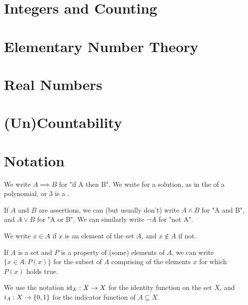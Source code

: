 \documentclass[12pt]{article}
\begin{document}
\section{Integers and Counting}

\section{Elementary Number Theory}
\section{Real Numbers}
\section{(Un)Countability}

\appendix

\newpage
\section{Notation}

We write $A \implies B$ for "if A then B".
We write \sol{} for a solution, as in the \sol{} of a polynomial, or $3$ is a \sol{}.

If $A$ and $B$ are assertions,
we can (but usually don't) write $A \land B$ for "A and B",
and $A \lor B$ for "A or B".
We can similarly write $\neg A$ for "not A".

We write $x \in A$ if $x$ is an element of the set $A$, and $x \notin A$ if not.

If $A$ is a set and $P$ is a property of (some) elements of $A$,
we can write $\{x \in A : P(x)\}$ for the subset of $A$ comprising
of the elements $x$ for which $P(x)$ holds true.

We use the notation $\operatorname{id}_{X} : X \to X$ for the identity function on the set $X$,
and $i_{A} : X \to \{0,1\}$ for the indicator function of $A \subseteq X$.
\end{document}

